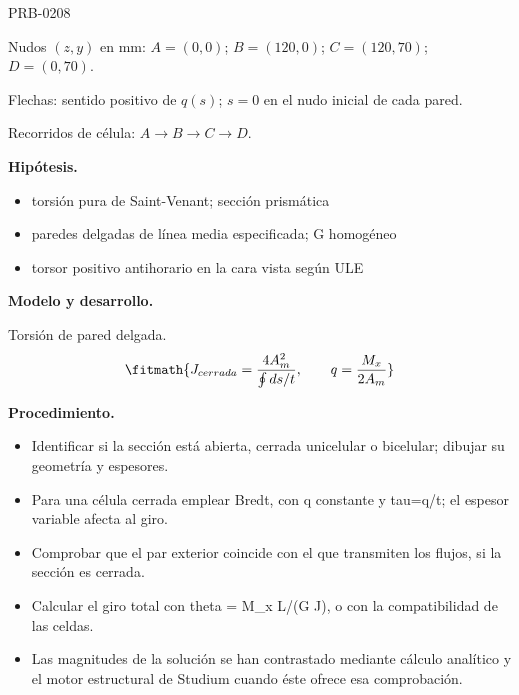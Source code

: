 \begin{studiumworked}{PRB-0208}
\par\medskip\noindent\begin{minipage}{\linewidth}\centering
{}
\par\small Nudos $(z,y)$ en mm: $A=(0,0)$; $B=(120,0)$; $C=(120,70)$; $D=(0,70)$.
\par\small Flechas: sentido positivo de $q(s)$; $s=0$ en el nudo inicial de cada pared.
\par\small Recorridos de célula: $A\to B\to C\to D$.
\par\normalsize\end{minipage}\par\medskip

\textbf{Hipótesis.}\begin{itemize}\item torsión pura de Saint-Venant; sección prismática
\item paredes delgadas de línea media especificada; G homogéneo
\item torsor positivo antihorario en la cara vista según ULE\end{itemize}

\textbf{Modelo y desarrollo.}

Torsión de pared delgada.\[\fitmath{J_{cerrada}=\frac{4A_m^2}{\oint ds/t},\qquad q=\frac{M_x}{2A_m}}\]

\textbf{Procedimiento.}\begin{itemize}\item Identificar si la sección está abierta, cerrada unicelular o bicelular; dibujar su geometría y espesores.
\item Para una célula cerrada emplear Bredt, con q constante y tau=q/t; el espesor variable afecta al giro.
\item Comprobar que el par exterior coincide con el que transmiten los flujos, si la sección es cerrada.
\item Calcular el giro total con theta = M\_x L/(G J), o con la compatibilidad de las celdas.
\item Las magnitudes de la solución se han contrastado mediante cálculo analítico y el motor estructural de Studium cuando éste ofrece esa comprobación.\end{itemize}


\end{studiumworked}
